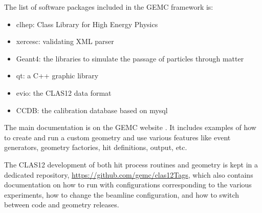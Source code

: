 The list of software packages included in the GEMC framework is:

\begin{itemize}
	\item clhep: Class Library for High Energy Physics \cite{clhep}
	\item xercesc: validating XML parser \cite{xercesc}
	\item Geant4: the libraries to simulate the passage of particles through matter \cite{geant4}
	\item qt: a C++ graphic library \cite{qt}
	\item evio: the CLAS12 data format \cite{evio}
	\item CCDB: the calibration database based on mysql \cite{ccdb}
\end{itemize}

The main documentation is on the GEMC website \cite{GEMC}. It includes examples of how to create and run a custom geometry
and use various features like event generators, geometry factories, hit definitions, output, etc.

The CLAS12 development of both hit process routines and geometry is kept in a dedicated repository, \url{https://github.com/gemc/clas12Tags},
which also contains documentation on how to run with configurations corresponding to the various experiments, how to change the
beamline configuration, and how to switch between code and geometry releases.





